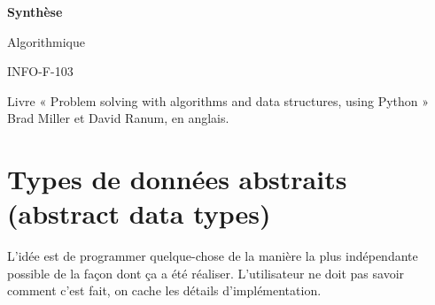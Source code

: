 \documentclass[10pt]{article}
\begin{document}
    \begin{titlepage}
    \centering 
    \vspace*{\fill}
    \huge\bfseries
    Synthèse
    
    Algorithmique
    
    INFO-F-103
    \vspace*{\fill}
    \end{titlepage}
\tableofcontents
\newpage
\noindent Livre « Problem solving with algorithms and data structures, using Python » Brad Miller et David Ranum, en anglais.

\section{Types de données abstraits (abstract data types)}
L'idée est de programmer quelque-chose de la manière la plus indépendante possible de la façon dont ça a été réaliser. L'utilisateur ne doit pas savoir comment c'est fait, on cache les détails d'implémentation.
\end{document}
